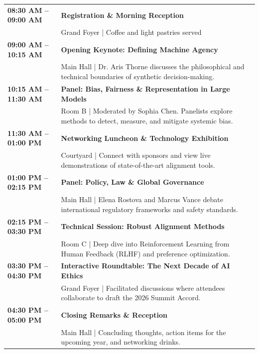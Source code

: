 \documentclass[10pt]{article}
\begin{document}
\begin{tabularx}{\linewidth}{@{}>{\color{primary}\bfseries}l@{\hspace{8mm}}>{\raggedright\arraybackslash}X@{}}
  08:30 AM -- 09:00 AM & \textbf{Registration \& Morning Reception} \\
                       & \textcolor{muted}{\small Grand Foyer | Coffee and light pastries served} \\[0.2cm]
  09:00 AM -- 10:15 AM & \textbf{Opening Keynote: Defining Machine Agency} \\
                       & \textcolor{muted}{\small Main Hall | Dr. Aris Thorne discusses the philosophical and technical boundaries of synthetic decision-making.} \\[0.2cm]
  10:15 AM -- 11:30 AM & \textbf{Panel: Bias, Fairness \& Representation in Large Models} \\
                       & \textcolor{muted}{\small Room B | Moderated by Sophia Chen. Panelists explore methods to detect, measure, and mitigate systemic bias.} \\[0.2cm]
  11:30 AM -- 01:00 PM & \textbf{Networking Luncheon \& Technology Exhibition} \\
                       & \textcolor{muted}{\small Courtyard | Connect with sponsors and view live demonstrations of state-of-the-art alignment tools.} \\[0.2cm]
  01:00 PM -- 02:15 PM & \textbf{Panel: Policy, Law \& Global Governance} \\
                       & \textcolor{muted}{\small Main Hall | Elena Rostova and Marcus Vance debate international regulatory frameworks and safety standards.} \\[0.2cm]
  02:15 PM -- 03:30 PM & \textbf{Technical Session: Robust Alignment Methods} \\
                       & \textcolor{muted}{\small Room C | Deep dive into Reinforcement Learning from Human Feedback (RLHF) and preference optimization.} \\[0.2cm]
  03:30 PM -- 04:30 PM & \textbf{Interactive Roundtable: The Next Decade of AI Ethics} \\
                       & \textcolor{muted}{\small Grand Foyer | Facilitated discussions where attendees collaborate to draft the 2026 Summit Accord.} \\[0.25cm]
  04:30 PM -- 05:00 PM & \textbf{Closing Remarks \& Reception} \\
                       & \textcolor{muted}{\small Main Hall | Concluding thoughts, action items for the upcoming year, and networking drinks.}
\end{tabularx}
\end{document}
